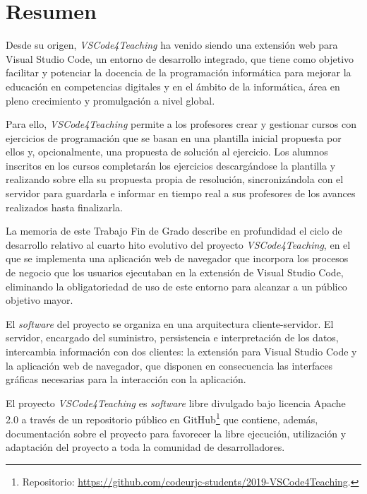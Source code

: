 \chapter*{Resumen}

Desde su origen, \textit{VSCode4Teaching} ha venido siendo una extensión web para Visual Studio Code, un entorno de desarrollo integrado, que tiene como objetivo facilitar y potenciar la docencia de la programación informática para mejorar la educación en competencias digitales y en el ámbito de la informática, área en pleno crecimiento y promulgación a nivel global.

Para ello, \textit{VSCode4Teaching} permite a los profesores crear y gestionar cursos con ejercicios de programación que se basan en una plantilla inicial propuesta por ellos y, opcionalmente, una propuesta de solución al ejercicio. Los alumnos inscritos en los cursos completarán los ejercicios descargándose la plantilla y realizando sobre ella su propuesta propia de resolución, sincronizándola con el servidor para guardarla e informar en tiempo real a sus profesores de los avances realizados hasta finalizarla.

La memoria de este Trabajo Fin de Grado describe en profundidad el ciclo de desarrollo relativo al cuarto hito evolutivo del proyecto \textit{VSCode4Teaching}, en el que se implementa una aplicación web de navegador que incorpora los procesos de negocio que los usuarios ejecutaban en la extensión de Visual Studio Code, eliminando la obligatoriedad de uso de este entorno para alcanzar a un público objetivo mayor.

El \textit{software} del proyecto se organiza en una arquitectura cliente-servidor. El servidor, encargado del suministro, persistencia e interpretación de los datos, intercambia información con dos clientes: la extensión para Visual Studio Code y la aplicación web de navegador, que disponen en consecuencia las interfaces gráficas necesarias para la interacción con la aplicación.

El proyecto \textit{VSCode4Teaching} es \textit{software} libre divulgado bajo licencia Apache 2.0 a través de un repositorio público en GitHub\footnote{Repositorio: \href{https://github.com/codeurjc-students/2019-VSCode4Teaching}{https://github.com/codeurjc-students/2019-VSCode4Teaching}.} que contiene, además, documentación sobre el proyecto para favorecer la libre ejecución, utilización y adaptación del proyecto a toda la comunidad de desarrolladores.

\vspace{2pt}

